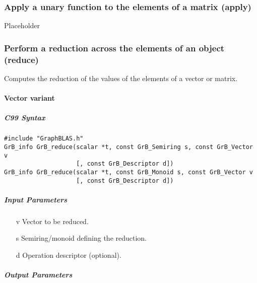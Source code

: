 \subsubsection{Apply a unary function to the elements of a matrix ({\sf apply})}

Placeholder

\subsubsection{Perform a reduction across the elements of an object ({\sf reduce})}

Computes the reduction of the values of the elements of a vector or matrix.

\paragraph{Vector variant}

\subparagraph{C99 Syntax}

\begin{verbatim}
#include "GraphBLAS.h"
GrB_info GrB_reduce(scalar *t, const GrB_Semiring s, const GrB_Vector v
                    [, const GrB_Descriptor d])
GrB_info GrB_reduce(scalar *t, const GrB_Monoid s, const GrB_Vector v
                    [, const GrB_Descriptor d])
\end{verbatim}



\subparagraph{Input Parameters}

\begin{itemize}
	\item[{\sf v}] Vector to be reduced.
	\item[{\sf s}] Semiring/monoid defining the reduction.
	\item[{\sf d}] Operation descriptor (optional).
\end{itemize}

\subparagraph{Output Parameters}

